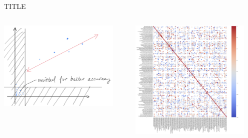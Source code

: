 \begin{frame}{TITLE}
    \begin{columns}
        \begin{column}{0.5\textwidth}
            \centering
            \includegraphics[height=0.9\textheight,width=0.9\textwidth,keepaspectratio]{images/conf_filter_explanation.jpeg}   
        \end{column}
        \begin{column}{0.5\textwidth}
            \centering
            \includegraphics[height=0.9\textheight,width=0.9\textwidth,keepaspectratio]{images/confidence_filter.png} 
        \end{column}
    \end{columns}
\end{frame}


